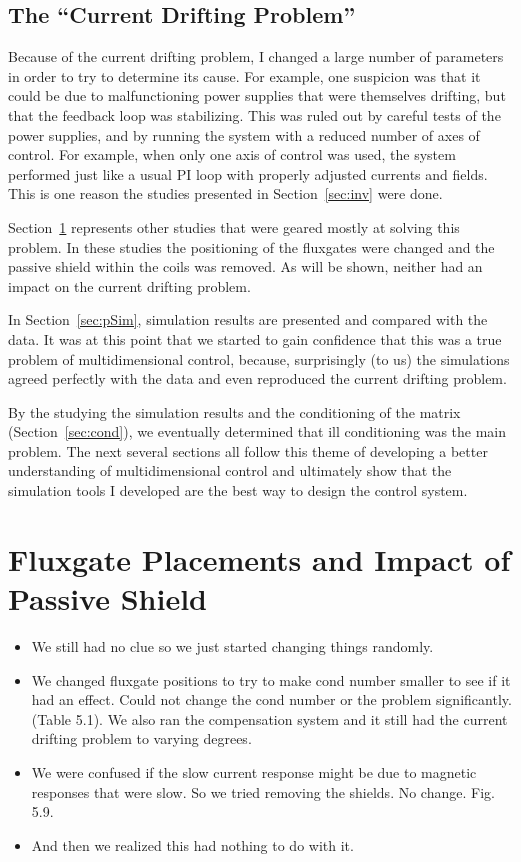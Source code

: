 \subsection{The ``Current Drifting Problem''}

Because of the current drifting problem, I changed a large number of
parameters in order to try to determine its cause.  For example, one
suspicion was that it could be due to malfunctioning power supplies
that were themselves drifting, but that the feedback loop was
stabilizing.  This was ruled out by careful tests of the power
supplies, and by running the system with a reduced number of axes of
control.  For example, when only one axis of control was used, the
system performed just like a usual PI loop with properly adjusted
currents and fields.  This is one reason the studies presented in
Section~\ref{sec:inv} were done.

Section~\ref{sec:flux_place} represents other studies that were geared
mostly at solving this problem.  In these studies the positioning of
the fluxgates were changed and the passive shield within the coils was
removed.  As will be shown, neither had an impact on the current
drifting problem.

In Section~\ref{sec:pSim}, simulation results are presented and
compared with the data.  It was at this point that we started to gain
confidence that this was a true problem of multidimensional control,
because, surprisingly (to us) the simulations agreed perfectly with
the data and even reproduced the current drifting problem.

By the studying the simulation results and the conditioning of the
matrix (Section~\ref{sec:cond}), we eventually determined that
ill conditioning was the main problem.  The next several sections all
follow this theme of developing a better understanding of
multidimensional control and ultimately show that the simulation tools
I developed are the best way to design the control system.


\section{Fluxgate Placements and Impact of Passive Shield}\label{sec:flux_place}


\begin{itemize}
\item We still had no clue so we just started changing things randomly.
\item We changed fluxgate positions to try to make cond number smaller to see if it had an effect.  Could not change the cond number or the problem significantly.  (Table 5.1).  We also ran the compensation system and it still had the current drifting problem to varying degrees.
\item We were confused if the slow current response might be due to magnetic responses that were slow.  So we tried removing the shields.  No change.  Fig. 5.9.
\item And then we realized this had nothing to do with it.
\end{itemize}

